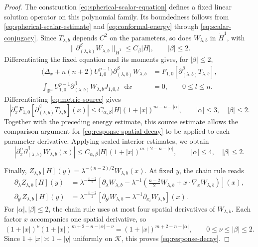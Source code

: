 \documentclass[11pt]{article}
\numberwithin{equation}{section}
\theoremstyle{remark}
\newcommand{\R}{\mathbb R}
\newcommand{\dd}{\mathop{}\!\mathrm{d}}
\begin{document}
\begin{proof}
The construction \eqref{eq:spherical-scalar-equation} defines a fixed
linear solution operator on this polynomial family. Its boundedness
follows from \eqref{eq:spherical-scalar-estimate} and
\eqref{eq:conformal-energy}  through  \eqref{eq:scalar-conjugacy}.
Since \(T_{\lambda,b}\) depends \(C^2\) on the parameters, so does
\(W_{\lambda,b}\) in \(\dot H^1\), with
\[
 \|\partial_{(\lambda,b)}^\beta W_{\lambda,b}\|_{\dot H^1}
 \le C_\beta|H|,\qquad |\beta|\le2.
\]
Differentiating the fixed equation and its moments gives, for
\(|\beta|\le2\),
 {
\[
 \begin{aligned}
 \bigl(\Delta_x+n(n+2)U_{1,0}^{p-1}\bigr)
 \partial_{(\lambda,b)}^\beta W_{\lambda,b}
 &=F_{1,0}[\partial_{(\lambda,b)}^\beta T_{\lambda,b}],\\
 \int_{\R^n}U_{1,0}^{p-1}
 \partial_{(\lambda,b)}^\beta W_{\lambda,b}J_{1,0,l}\,\dd x&=0,
 \qquad 0\le l\le n.
 \end{aligned}
\]
}
Differentiating \eqref{eq:metric-source} gives
\[
 \left|\partial_x^\alpha
 F_{1,0}[\partial_{(\lambda,b)}^\beta T_{\lambda,b}](x)\right|
 \le C_{\alpha,\beta}|H|(1+|x|)^{m-n-|\alpha|},
 \qquad |\alpha|\le3,\quad |\beta|\le2.
\]
{Together with the preceding energy estimate, this source estimate}
allows the comparison argument for \eqref{eq:response-spatial-decay}
to be applied to each parameter derivative.
{Applying scaled interior estimates, we obtain}
\[
 |\partial_x^\alpha\partial_{(\lambda,b)}^\beta W_{\lambda,b}(x)|
 \le C_{\alpha,\beta}|H|(1+|x|)^{m+2-n-|\alpha|},
 \qquad |\alpha|\le4,\quad |\beta|\le2.
\]

Finally,
\(Z_{\lambda,b}[H](y)=\lambda^{-(n-2)/2}W_{\lambda,b}(x)\).
At fixed \(y\), the chain rule reads
\[
 \begin{aligned}
 \partial_\lambda Z_{\lambda,b}[H](y)
 &=\lambda^{-\frac{n-2}{2}}
 \left[\partial_\lambda W_{\lambda,b}
 -\lambda^{-1}\left(\frac{n-2}{2}W_{\lambda,b}
                   +x\cdot\nabla_xW_{\lambda,b}\right)\right](x),\\
 \partial_{b^i}Z_{\lambda,b}[H](y)
 &=\lambda^{-\frac{n-2}{2}}
 \left[\partial_{b^i}W_{\lambda,b}
       -\lambda^{-1}\partial_{x_i}W_{\lambda,b}\right](x).
 \end{aligned}
\]
For \(|\alpha|,|\beta|\le2\), the chain rule uses at most four spatial
derivatives of \(W_{\lambda,b}\). Each factor \(x\) accompanies one
spatial derivative, so
\[
 (1+|x|)^\nu
(1+|x|)^{m+2-n-|\alpha|-\nu}
=(1+|x|)^{m+2-n-|\alpha|},
\qquad 0\le\nu\le|\beta|\le2.
\]
Since \(1+|x|\asymp1+|y|\) uniformly on \(\mathcal K\), this proves
\eqref{eq:response-decay}.
\end{proof}
\end{document}

